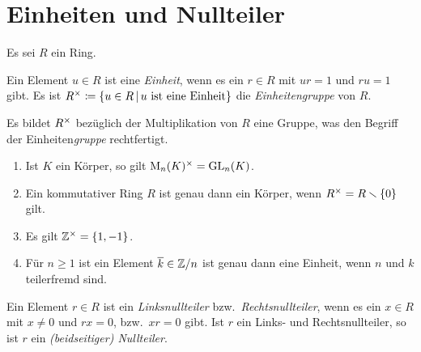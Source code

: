 \section{Einheiten und Nullteiler}

Es sei $R$ ein Ring.

\begin{definition}
  Ein Element $u \in R$ ist eine \emph{Einheit}, wenn es ein $r \in R$ mit $ur = 1$ und $ru = 1$ gibt.
  Es ist
  $
              \unitgroup{R}
    \defined  \{
                u \in R
              \suchthat 
                \text{$u$ ist eine Einheit}
              \}
  $
  die \emph{Einheitengruppe} von $R$.
\end{definition}

Es bildet $R^{\times}$ bezüglich der Multiplikation von $R$ eine Gruppe, was den Begriff der Einheiten\emph{gruppe} rechtfertigt.

\begin{example}
  \begin{enumerate}
    \item
      Ist $K$ ein Körper, so gilt $\operatorname{M}_{n}(K)^{\times} = \operatorname{GL}_{n}(K)$.
    \item
      Ein kommutativer Ring $R$ ist genau dann ein Körper, wenn $R^{\times} = R \smallsetminus \{0\}$ gilt.
    \item
      Es gilt $\mathbb{Z}^{\times} = \{1, -1\}$.
    \item
      Für $n \geq 1$ ist ein Element $\overline{k} \in \mathbb{Z}/n$ ist genau dann eine Einheit, wenn $n$ und $k$ teilerfremd sind.
  \end{enumerate}
\end{example}

\begin{definition}
  Ein Element $r \in R$ ist ein \emph{Linksnullteiler} bzw.\ \emph{Rechtsnullteiler}, wenn es ein $x \in R$ mit $x \neq 0$ und $rx = 0$, bzw.\ $xr = 0$ gibt.
  Ist $r$ ein Links- und Rechtsnullteiler, so ist $r$ ein \emph{\textup(beidseitiger\textup) Nullteiler}.
\end{definition}

